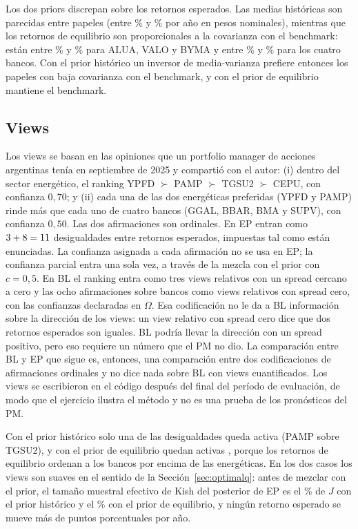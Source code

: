 \documentclass[11pt]{article}
\begin{document}
Los dos priors discrepan sobre los retornos esperados. Las medias
hist\'oricas son parecidas entre papeles (entre \nMuHistMin\% y
\nMuHistMax\% por a\~no en pesos nominales), mientras que los retornos de
equilibrio son proporcionales a la covarianza con el benchmark: est\'an
entre \nPiLowMin\% y \nPiLowMax\% para ALUA, VALO y BYMA y entre
\nPiBankMin\% y \nPiBankMax\% para los cuatro bancos. Con el prior
hist\'orico un inversor de media-varianza prefiere entonces los papeles con
baja covarianza con el benchmark, y con el prior de equilibrio mantiene el
benchmark.

\subsection{Views}

Los views se basan en las opiniones que un portfolio manager de acciones
argentinas ten\'ia en septiembre de 2025 y comparti\'o con el autor: (i)
dentro del sector energ\'etico, el ranking YPFD $\succ$ PAMP $\succ$ TGSU2
$\succ$ CEPU, con confianza $0{,}70$; y (ii) cada una de las dos
energ\'eticas preferidas (YPFD y PAMP) rinde m\'as que cada uno de cuatro
bancos (GGAL, BBAR, BMA y SUPV), con confianza $0{,}50$. Las dos
afirmaciones son ordinales. En EP entran como $3 + 8 = 11$
desigualdades entre retornos esperados, impuestas tal como est\'an
enunciadas. La confianza asignada a cada afirmaci\'on no se usa en EP; la
confianza parcial entra una sola vez, a trav\'es de la
mezcla con el prior con $c=0{,}5$. En BL el ranking entra como tres views
relativos con un spread cercano a cero y las ocho afirmaciones sobre bancos
como views relativos con spread cero, con las confianzas declaradas en
$\Omega$. Esa codificaci\'on no le da a BL informaci\'on sobre la direcci\'on
de los views: un view relativo con spread cero dice que dos retornos
esperados son iguales. BL podr\'ia llevar la direcci\'on con un spread
positivo, pero eso requiere un n\'umero que el PM no dio. La comparaci\'on
entre BL y EP que sigue es, entonces, una comparaci\'on entre dos
codificaciones de afirmaciones ordinales y no dice nada sobre BL con views
cuantificados. Los views se escribieron en el c\'odigo despu\'es del final del
per\'iodo de evaluaci\'on, de modo que el ejercicio ilustra el m\'etodo y no es
una prueba de los pron\'osticos del PM.

Con el prior hist\'orico solo una de las \nIneq{} desigualdades queda activa
(PAMP sobre TGSU2), y con el prior de equilibrio quedan activas
\nActiveEq, porque los retornos de equilibrio ordenan a los bancos por
encima de las energ\'eticas. En los dos casos los views son suaves en el
sentido de la Secci\'on~\ref{sec:optimalq}: antes de mezclar con el prior,
el tama\~no muestral efectivo de Kish del posterior de EP es el
\nEssHist\% de $J$ con el prior hist\'orico y el \nEssEq\% con el prior de
equilibrio, y ning\'un retorno esperado
se mueve m\'as de \nShiftEq{} puntos porcentuales por a\~no.
\end{document}
